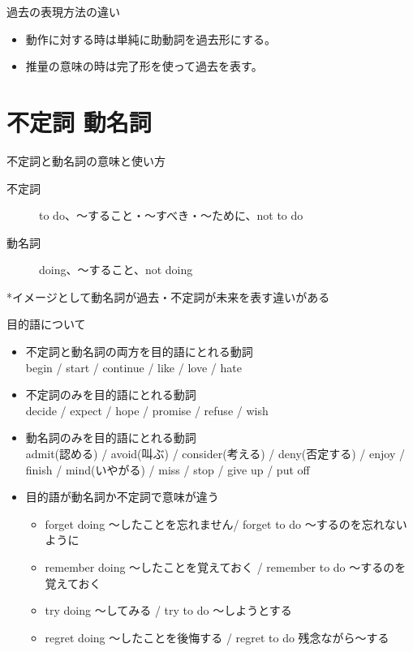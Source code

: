 \documentclass[10pt]{jsarticle}
\newcommand{\answer}[2]{{\color{orange}#2}}
\newcommand{\answer}[2]{\vspace{#1mm}}
\begin{document}
\begin{itembox}[l]{過去の表現方法の違い}
	\answer{20}{
		\begin{itemize}
			\item 動作に対する時は単純に助動詞を過去形にする。
			\item 推量の意味の時は完了形を使って過去を表す。
		\end{itemize}
	}
\end{itembox}

\newpage

\section{不定詞 動名詞}

\begin{itembox}[l]{不定詞と動名詞の意味と使い方}
	\answer{8}{
		\begin{description}
			\item[不定詞] to do、〜すること・〜すべき・〜ために、not to do
			\item[動名詞] doing、〜すること、not doing
		\end{description}
		*イメージとして動名詞が過去・不定詞が未来を表す違いがある
	}
\end{itembox}

\begin{itembox}[l]{目的語について}
	\begin{itemize}
		\item 不定詞と動名詞の両方を目的語にとれる動詞  \answer{10}{\\begin / start / continue / like / love / hate}
		\item 不定詞のみを目的語にとれる動詞  \answer{10}{\\decide / expect / hope / promise / refuse / wish}
		\item 動名詞のみを目的語にとれる動詞  \answer{10}{\\admit(認める) / avoid(叫ぶ) / consider(考える) / deny(否定する) /  enjoy / finish / mind(いやがる) / miss / stop / give up / put off}
		\item 目的語が動名詞か不定詞で意味が違う  \answer{10}{
			      \begin{itemize}
				      \item forget doing 〜したことを忘れません/ forget to do 〜するのを忘れないように
				      \item remember doing 〜したことを覚えておく / remember to do 〜するのを覚えておく
				      \item try doing 〜してみる / try to do 〜しようとする
				      \item regret doing 〜したことを後悔する / regret to do 残念ながら〜する
			      \end{itemize}
		      }
	\end{itemize}
\end{itembox}
\end{document}
